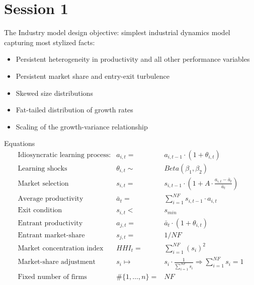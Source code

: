 \documentclass[bigger,aspectratio=169]{beamer}
\begin{document}
\section{Session 1}
\label{sec:org94ce79e}
\begin{frame}[label={sec:orge7649e0}]{The Industry model}
\textcite{dosi_2017_footprint} design objective: simplest industrial dynamics model capturing most \alert{stylized facts}:
\begin{itemize}
\item Persistent heterogeneity in productivity and all other performance variables
\item Persistent market share and entry-exit turbulence
\item Skewed size distributions
\item Fat-tailed distribution of growth rates
\item Scaling of the growth-variance relationship
\end{itemize}
\end{frame}
\begin{frame}[label={sec:org4b0a484}]{Equations}
\[ \begin{array}{lrl}
\mbox{Idiosyncratic learning process:} & a_{i,t} = &a_{i,t-1}\cdot (1 + \theta_{i,t})\\
\mbox{Learning shocks} & \theta_{i,t} \sim  & Beta(\beta_1, \beta_2)\\
\mbox{Market selection} & s_{i,t} =  & s_{i,t-1} \cdot \left( 1 + A\cdot\frac{a_{i,t} - \bar{a}_{t}}{\bar{a}_{t}}\right) \\
\mbox{Average productivity} & \bar{a}_{t} =  & \sum_{i=1}^{NF} s_{i, t-1}\cdot a_{i,t} \\
\mbox{Exit condition} & s_{i,t} < & s_{min}\\
\mbox{Entrant productivity} & a_{j,t} =&  \bar{a}_{t}\cdot (1 + \theta_{i,t})\\
\mbox{Entrant market-share} & s_{j,t} =& 1/NF \\
\mbox{Market concentration index} & HHI_{t} =& \sum_{i=1}^{NF} (s_{i})^2 \\
\mbox{Market-share adjustment} &  s_{i} \mapsto & s_{i}\cdot \frac{1}{\sum_{i=1}^{NF} s_{i}} \Rightarrow \sum_{i=1}^{NF} s_{i} = 1 \\
\mbox{Fixed number of firms} & \#\{1, \ldots, n\} =& NF
\end{array}\]
\end{frame}
\end{document}
